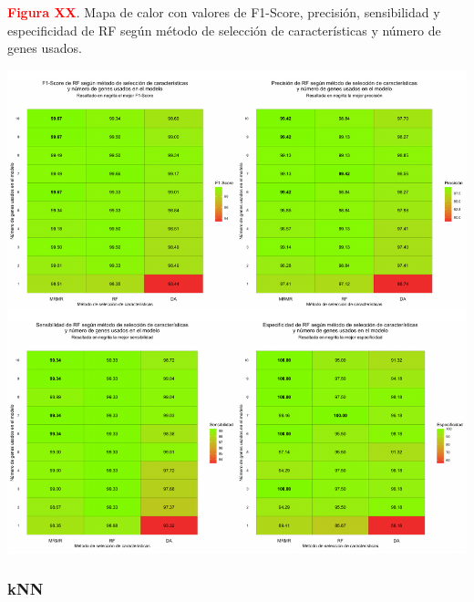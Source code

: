 \newpage
\textbf{\textcolor{red}{Figura XX}}. Mapa de calor con valores de F1-Score, precisión, sensibilidad y especificidad de RF según método de selección de características y número de genes usados.
\begin{center}
	\includegraphics[width=1\textwidth]{figuras/higado_biclase_heatmap_rf.pdf} \\
\end{center}

\newpage
\subsubsection{kNN}

